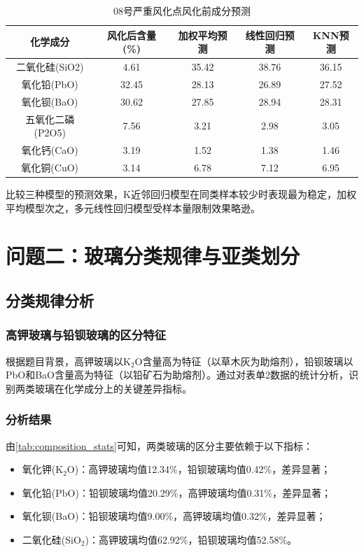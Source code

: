 \documentclass{cumcmthesis}
\begin{document}
\begin{table}[!htbp]
    \centering
    \caption{08号严重风化点风化前成分预测}
    \label{tab:prediction}
    \begin{tabular}{c|c|c|c|c}
        \toprule[1.5pt]
        化学成分 & 风化后含量(\%) & 加权平均预测 & 线性回归预测 & KNN预测 \\
        \midrule[1pt]
        二氧化硅(SiO2) & 4.61 & 35.42 & 38.76 & 36.15 \\
        氧化铅(PbO) & 32.45 & 28.13 & 26.89 & 27.52 \\
        氧化钡(BaO) & 30.62 & 27.85 & 28.94 & 28.31 \\
        五氧化二磷(P2O5) & 7.56 & 3.21 & 2.98 & 3.05 \\
        氧化钙(CaO) & 3.19 & 1.52 & 1.38 & 1.46 \\
        氧化铜(CuO) & 3.14 & 6.78 & 7.12 & 6.95 \\
        \bottomrule[1.5pt]
    \end{tabular}
\end{table}

比较三种模型的预测效果，K近邻回归模型在同类样本较少时表现最为稳定，加权平均模型次之，多元线性回归模型受样本量限制效果略逊。

\section{问题二：玻璃分类规律与亚类划分}

\subsection{分类规律分析}

\subsubsection{高钾玻璃与铅钡玻璃的区分特征}
根据题目背景，高钾玻璃以K$_2$O含量高为特征（以草木灰为助熔剂），铅钡玻璃以PbO和BaO含量高为特征（以铅矿石为助熔剂）。通过对表单2数据的统计分析，识别两类玻璃在化学成分上的关键差异指标。

\subsubsection{分析结果}
由\cref{tab:composition_stats}可知，两类玻璃的区分主要依赖于以下指标：
\begin{itemize}
    \item 氧化钾(K$_2$O)：高钾玻璃均值12.34\%，铅钡玻璃均值0.42\%，差异显著；
    \item 氧化铅(PbO)：铅钡玻璃均值20.29\%，高钾玻璃均值0.31\%，差异显著；
    \item 氧化钡(BaO)：铅钡玻璃均值9.00\%，高钾玻璃均值0.32\%，差异显著；
    \item 二氧化硅(SiO$_2$)：高钾玻璃均值62.92\%，铅钡玻璃均值52.58\%。
\end{itemize}
\end{document}
